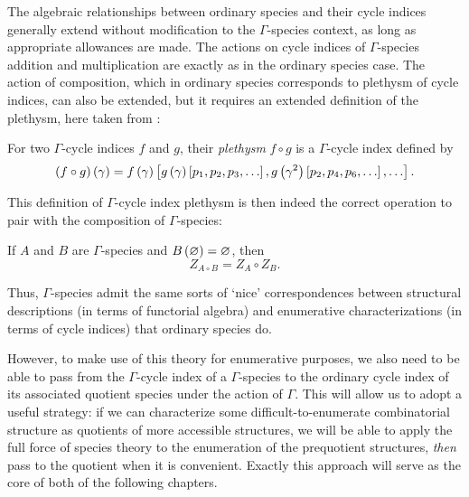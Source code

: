 \documentclass[sectionflow,singlespace,twoside,boldmathhdr]{brandiss} %
\numberwithin{section}{chapter}
\numberwithin{figure}{chapter}
\begin{document}
The algebraic relationships between ordinary species and their cycle indices generally extend without modification to the $\Gamma$-species context, as long as appropriate allowances are made.
The actions on cycle indices of $\Gamma$-species addition and multiplication are exactly as in the ordinary species case.
The action of composition, which in ordinary species corresponds to plethysm of cycle indices, can also be extended, but it requires an extended definition of the plethysm, here taken from \cite[\S 3]{hend:specfield}:
\begin{definition}
  \label{def:gcipleth}
  For two $\Gamma$-cycle indices $f$ and $g$, their \emph{plethysm} $f \circ g$ is a $\Gamma$-cycle index defined by
  \begin{equation}
    \left( {f \circ g} \right) \left( {\gamma} \right) = f \left( {\gamma} \right) \left[ {g \left( {\gamma} \right) \left[ {p_{1}, p_{2}, p_{3}, \dots} \right], g \left( {\gamma^{2}} \right) \left[ {p_{2}, p_{4}, p_{6}, \dots} \right], \dots} \right].
    \label{eq:gcipleth}
  \end{equation}
\end{definition}
This definition of $\Gamma$-cycle index plethysm is then indeed the correct operation to pair with the composition of $\Gamma$-species:
\begin{theorem}
  \label{thm:gspeccomp}
  If $A$ and $B$ are $\Gamma$-species and $B \left( {\varnothing} \right) = \varnothing$, then
  \begin{equation}
    \label{eq:gspeccomp}
    Z_{A \circ B} = Z_{A} \circ Z_{B}.
  \end{equation}
\end{theorem}
Thus, $\Gamma$-species admit the same sorts of `nice' correspondences between structural descriptions (in terms of functorial algebra) and enumerative characterizations (in terms of cycle indices) that ordinary species do.

However, to make use of this theory for enumerative purposes, we also need to be able to pass from the $\Gamma$-cycle index of a $\Gamma$-species to the ordinary cycle index of its associated quotient species under the action of $\Gamma$.
This will allow us to adopt a useful strategy: if we can characterize some difficult-to-enumerate combinatorial structure as quotients of more accessible structures, we will be able to apply the full force of species theory to the enumeration of the prequotient structures, \emph{then} pass to the quotient when it is convenient.
Exactly this approach will serve as the core of both of the following chapters.
\end{document}
